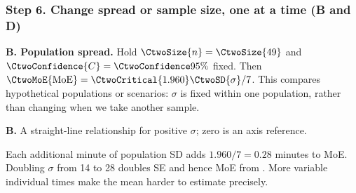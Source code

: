 \subsubsection*{Step 6. Change spread or sample size, one at a time (B and D)}
\textbf{B. Population spread.} Hold $\CtwoSize{n}=\CtwoSize{49}$ and
$\CtwoConfidence{C}=\CtwoConfidence{95\%}$ fixed. Then
$\CtwoMoE{\mathrm{MoE}}=\CtwoCritical{1.960}\CtwoSD{\sigma}/7$.
This compares hypothetical populations or scenarios: $\sigma$ is fixed within
one population, rather than changing when we take another sample.
\begin{center}
\par\small\textbf{B.} A straight-line relationship for positive $\sigma$; zero is an axis reference.
\end{center}
Each additional minute of population SD adds $1.960/7=0.28$ minutes to MoE.
Doubling $\sigma$ from 14 to 28 doubles SE and hence MoE from
. More variable individual times make the mean harder to estimate precisely.

